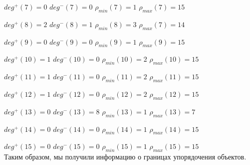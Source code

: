\documentclass[14pt,fleqn]{extarticle}
\begin{document}
	$deg^+(7) = 0$ \hspace{0.55cm} $deg^-(7) = 0$ \hspace{0.55cm} $\rho_{min}(7) = 1$ \hspace{0.55cm} $\rho_{max}(7) = 15$
	
	$deg^+(8) = 2$ \hspace{0.55cm} $deg^-(8) = 1$ \hspace{0.55cm} $\rho_{min}(8) = 3$ \hspace{0.55cm} $\rho_{max}(7) = 14$

	$deg^+(9) = 0$ \hspace{0.55cm} $deg^-(9) = 0$ \hspace{0.55cm} $\rho_{min}(9) = 1$ \hspace{0.55cm} $\rho_{max}(9) = 15$
	
	$deg^+(10) = 1$ \hspace{0.3cm} $deg^-(10) = 0$ \hspace{0.3cm} $\rho_{min}(10) = 2$ \hspace{0.3cm} $\rho_{max}(10) = 15$
	
	$deg^+(11) = 1$ \hspace{0.3cm} $deg^-(11) = 0$ \hspace{0.3cm} $\rho_{min}(11) = 2$ \hspace{0.3cm} $\rho_{max}(11) = 15$
	
	$deg^+(12) = 1$ \hspace{0.3cm} $deg^-(12) = 0$ \hspace{0.3cm} $\rho_{min}(12) = 2$ \hspace{0.3cm} $\rho_{max}(12) = 15$

	$deg^+(13) = 0$ \hspace{0.3cm} $deg^-(13) = 8$ \hspace{0.3cm} $\rho_{min}(13) = 1$ \hspace{0.3cm} $\rho_{max}(13) = 7$
	
	$deg^+(14) = 0$ \hspace{0.3cm} $deg^-(14) = 0$ \hspace{0.3cm} $\rho_{min}(14) = 1$ \hspace{0.3cm} $\rho_{max}(14) = 15$

	$deg^+(15) = 0$ \hspace{0.3cm} $deg^-(15) = 0$ \hspace{0.3cm} $\rho_{min}(15) = 1$ \hspace{0.3cm} $\rho_{max}(15) = 15$\\

	Таким образом, мы получили информацию о границах упорядочения объектов.
	
\end{document}
